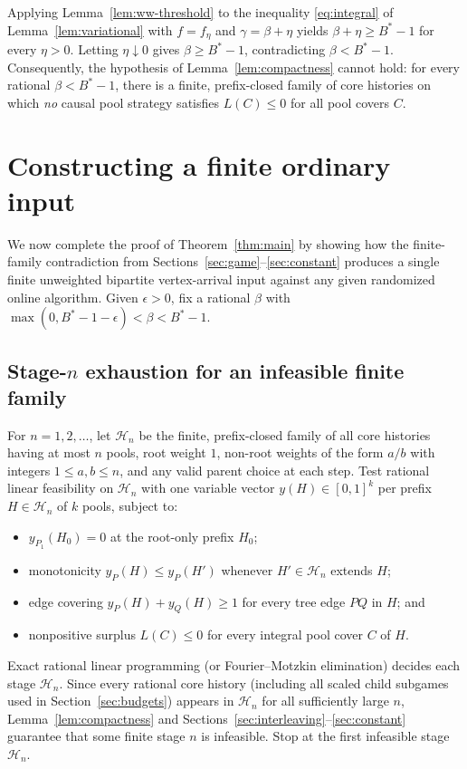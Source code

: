 \documentclass[11pt,letterpaper]{article}
\begin{document}
Applying Lemma~\ref{lem:ww-threshold} to the inequality \eqref{eq:integral} of Lemma~\ref{lem:variational} with $f=f_\eta$ and $\gamma=\beta+\eta$ yields $\beta+\eta \ge B^*-1$ for every $\eta>0$. Letting $\eta\downarrow 0$ gives $\beta\ge B^*-1$, contradicting $\beta < B^*-1$. Consequently, the hypothesis of Lemma~\ref{lem:compactness} cannot hold: for every rational $\beta < B^*-1$, there is a finite, prefix-closed family of core histories on which \emph{no} causal pool strategy satisfies $L(C)\le 0$ for all pool covers $C$.

\section{Constructing a finite ordinary input}\label{sec:finite}

We now complete the proof of Theorem~\ref{thm:main} by showing how the finite-family contradiction from Sections~\ref{sec:game}--\ref{sec:constant} produces a single finite unweighted bipartite vertex-arrival input against any given randomized online algorithm. Given $\epsilon>0$, fix a rational $\beta$ with $\max(0,B^*-1-\epsilon) < \beta < B^*-1$.

\subsection{\texorpdfstring{Stage-$n$}{Stage-n} exhaustion for an infeasible finite family}

For $n=1,2,\ldots$, let $\mathcal H_n$ be the finite, prefix-closed family of all core histories having at most $n$ pools, root weight $1$, non-root weights of the form $a/b$ with integers $1\le a,b\le n$, and any valid parent choice at each step. Test rational linear feasibility on $\mathcal H_n$ with one variable vector $y(H)\in[0,1]^k$ per prefix $H\in\mathcal H_n$ of $k$ pools, subject to:
\begin{itemize}
\item $y_{P_1}(H_0)=0$ at the root-only prefix $H_0$;
\item monotonicity $y_P(H)\le y_P(H')$ whenever $H'\in\mathcal H_n$ extends $H$;
\item edge covering $y_P(H)+y_Q(H)\ge 1$ for every tree edge $PQ$ in $H$; and
\item nonpositive surplus $L(C)\le 0$ for every integral pool cover $C$ of $H$.
\end{itemize}
Exact rational linear programming (or Fourier--Motzkin elimination) decides each stage $\mathcal H_n$. Since every rational core history (including all scaled child subgames used in Section~\ref{sec:budgets}) appears in $\mathcal H_n$ for all sufficiently large $n$, Lemma~\ref{lem:compactness} and Sections~\ref{sec:interleaving}--\ref{sec:constant} guarantee that some finite stage $n$ is infeasible. Stop at the first infeasible stage $\mathcal H_n$.
\end{document}
